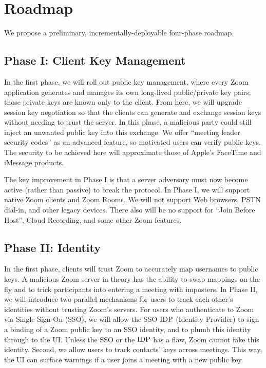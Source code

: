 \section{Roadmap}
We propose a preliminary, incrementally-deployable four-phase roadmap.

\subsection{Phase I: Client Key Management}
In the first phase, we will roll out public key management, where every Zoom application generates and manages its own long-lived public/private key pairs; those private keys are known only to the client. From here, we will upgrade session key negotiation so that the clients can generate and exchange session keys without needing to trust the server. In this phase, a malicious party could still inject an unwanted public key into this exchange. We offer ``meeting leader security codes'' as an advanced feature, so motivated users can verify public keys. The security to be achieved here will approximate those of Apple's FaceTime and iMessage products.

The key improvement in Phase I is that a server adversary must now become active (rather than passive) to break the protocol. In Phase I, we will support native Zoom clients and Zoom Rooms. We will not support Web browsers, PSTN dial-in, and other legacy devices. There also will be no support for ``Join Before Host'', Cloud Recording, and some other Zoom features.

\subsection{Phase II: Identity}
In the first phase, clients will trust Zoom to accurately map usernames to public keys. A malicious Zoom server in theory has the ability to swap mappings on-the-fly and to trick participants into entering a meeting with imposters. In Phase II, we will introduce two parallel mechanisms for users to track each other's identities without trusting Zoom's servers.  For users who authenticate to Zoom via Single-Sign-On (SSO), we will allow the SSO $\mathrm{IDP}$ (Identity Provider) to sign a binding of a Zoom public key to an SSO identity, and to plumb this identity through to the UI. Unless the SSO or the $\mathrm{IDP}$ has a flaw, Zoom cannot fake this identity. Second, we allow users to track contacts' keys across meetings. This way, the UI can surface warnings if a user joins a meeting with a new public key. 

